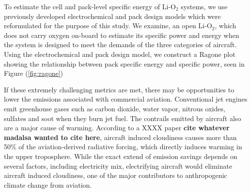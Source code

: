 \documentclass{achemso}
\begin{document}
To estimate the cell and pack-level specific energy of Li-O$\mathrm{_2}$ systems, we use previously developed electrochemical and pack design models\cite{gallagher2014quantifying} which were reformulated for the purpose of this study. We examine, an open Li-O$\mathrm{_2}$, which does not carry oxygen on-board to estimate its specific power and energy when the system is designed to meet the demands of the three categories of aircraft. Using the electrochemical and pack design model, we construct a Ragone plot showing the relationship between pack specific energy and specific power, seen in Figure (\ref{fig:ragone})


If these extremely challenging metrics are met, there may be opportunities to lower the emissions associated with commercial aviation. Conventional jet engines emit greenhouse gases such as carbon dioxide, water vapor, nitrous oxides, sulfates and soot when they burn jet fuel. The contrails emitted by aircraft also are a major cause of warming. According to a XXXX paper \textbf{cite whatever madalsa wanted to cite here}, aircraft induced cloudiness causes more than 50\% of the aviation-derived radiative forcing, which directly induces warming in the upper troposphere. While the exact extend of emission savings depends on several factors, including electricity mix, electrifying aircraft would eliminate aircraft induced cloudiness, one of the major contributors to anthropogenic climate change from aviation. 
\end{document}
